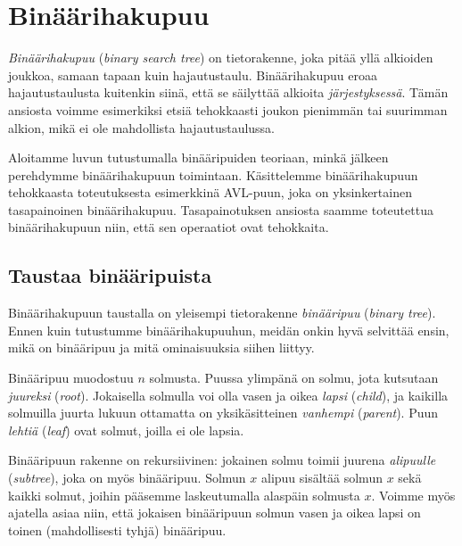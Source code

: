 \chapter{Binäärihakupuu}


\emph{Binäärihakupuu} (\emph{binary search tree})
on tietorakenne, joka pitää yllä
alkioiden joukkoa, samaan tapaan kuin hajautustaulu.
Binäärihakupuu eroaa hajautustaulusta kuitenkin siinä,
että se säilyttää alkioita \emph{järjestyksessä}.
Tämän ansiosta voimme esimerkiksi etsiä tehokkaasti
joukon pienimmän tai suurimman alkion,
mikä ei ole mahdollista hajautustaulussa.

Aloitamme luvun tutustumalla binääripuiden teoriaan,
minkä jälkeen perehdymme binäärihakupuun toimintaan.
Käsittelemme binäärihakupuun tehokkaasta toteutuksesta
esimerkkinä AVL-puun,
joka on yksinkertainen tasapainoinen binäärihakupuu.
Tasapainotuksen ansiosta saamme toteutettua binäärihakupuun niin,
että sen operaatiot ovat tehokkaita.

\section{Taustaa binääripuista}


Binäärihakupuun taustalla on yleisempi tietorakenne \emph{binääripuu}
(\emph{binary tree}).
Ennen kuin tutustumme binäärihakupuuhun,
meidän onkin hyvä selvittää ensin, mikä on binääripuu ja mitä
ominaisuuksia siihen liittyy.


Binääripuu muodostuu $n$ solmusta.
Puussa ylimpänä on solmu, jota kutsutaan \emph{juureksi} (\emph{root}).
Jokaisella solmulla voi olla vasen ja oikea \emph{lapsi} (\emph{child}),
ja kaikilla solmuilla juurta lukuun ottamatta on yksikäsitteinen
\emph{vanhempi} (\emph{parent}).
Puun \emph{lehtiä} (\emph{leaf}) ovat solmut, joilla ei ole lapsia.


Binääripuun rakenne on rekursiivinen:
jokainen solmu toimii juurena \emph{alipuulle} (\emph{subtree}),
joka on myös binääripuu.
Solmun $x$ alipuu sisältää solmun $x$ sekä kaikki
solmut, joihin pääsemme laskeutumalla alaspäin solmusta $x$.
Voimme myös ajatella asiaa niin, että jokaisen binääripuun
solmun vasen ja oikea lapsi on toinen (mahdollisesti tyhjä) binääripuu.

